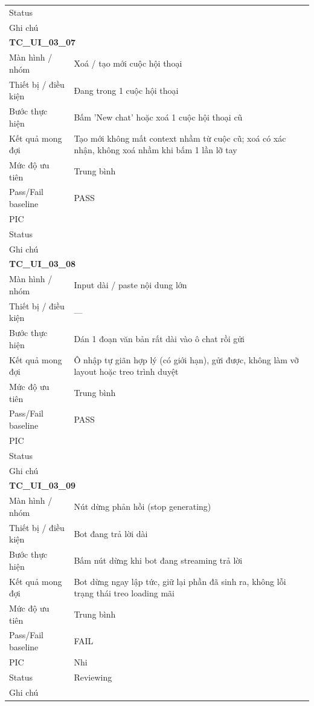 \documentclass[12pt,a4paper]{article}
\begin{document}
\begin{longtable}{p{3.0cm}p{11.5cm}}
Status &  \\
Ghi chú &  \\
\midrule
\multicolumn{2}{l}{\textbf{TC\_UI\_03\_07}} \\
Màn hình / nhóm & Xoá / tạo mới cuộc hội thoại \\
Thiết bị / điều kiện & Đang trong 1 cuộc hội thoại \\
Bước thực hiện & Bấm 'New chat' hoặc xoá 1 cuộc hội thoại cũ \\
Kết quả mong đợi & Tạo mới không mất context nhầm từ cuộc cũ; xoá có xác nhận, không xoá nhầm khi bấm 1 lần lỡ tay \\
Mức độ ưu tiên & Trung bình \\
Pass/Fail baseline & PASS \\
PIC &  \\
Status &  \\
Ghi chú &  \\
\midrule
\multicolumn{2}{l}{\textbf{TC\_UI\_03\_08}} \\
Màn hình / nhóm & Input dài / paste nội dung lớn \\
Thiết bị / điều kiện & — \\
Bước thực hiện & Dán 1 đoạn văn bản rất dài vào ô chat rồi gửi \\
Kết quả mong đợi & Ô nhập tự giãn hợp lý (có giới hạn), gửi được, không làm vỡ layout hoặc treo trình duyệt \\
Mức độ ưu tiên & Trung bình \\
Pass/Fail baseline & PASS \\
PIC &  \\
Status &  \\
Ghi chú &  \\
\midrule
\multicolumn{2}{l}{\textbf{TC\_UI\_03\_09}} \\
Màn hình / nhóm & Nút dừng phản hồi (stop generating) \\
Thiết bị / điều kiện & Bot đang trả lời dài \\
Bước thực hiện & Bấm nút dừng khi bot đang streaming trả lời \\
Kết quả mong đợi & Bot dừng ngay lập tức, giữ lại phần đã sinh ra, không lỗi trạng thái treo loading mãi \\
Mức độ ưu tiên & Trung bình \\
Pass/Fail baseline & FAIL \\
PIC & Nhi \\
Status & Reviewing \\
Ghi chú &  \\
\midrule

\end{longtable}
\end{document}
